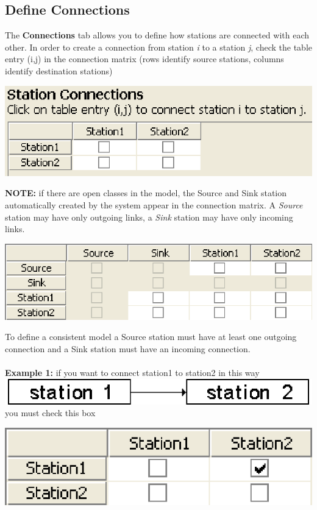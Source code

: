 \subsection{Define Connections}
\label{sec:DefineConnections} The \textbf{Connections} tab allows
you to define how stations are connected with each other. In order
to create a connection from station \emph{i} to a station
\emph{j}, check the table entry (i,j) in the connection matrix
(rows identify source stations, columns identify destination
stations)
\begin{center}
\includegraphics[scale=.5]{img/jsim/connections1.eps}
\end{center}
\textbf{NOTE:} if there are open classes in the model, the Source
and Sink station automatically created by the system appear in the
connection matrix.  A \emph{Source} station may have only outgoing
links, a \emph{Sink} station may have only incoming links.
\begin{center}
\includegraphics[scale=.5]{img/jsim/sink_source_connections.eps}
\end{center}
To define a consistent model a Source station must have at
least one outgoing connection and a Sink station must have an incoming connection.\\\\
\textbf{Example 1:} if you want to connect station1 to station2 in this way \includegraphics[scale=.5]{img/jsim/es1.eps} you must check this box
\begin{center}
\includegraphics[scale=.5]{img/jsim/connection1.eps}
\end{center}
